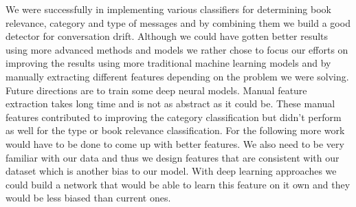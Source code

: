 \documentclass[11pt,a4paper]{article}
\begin{document}
We were successfully in implementing various classifiers for determining book relevance, category and type of messages and by combining them we build a good detector for conversation drift.
Although we could have gotten better results using more advanced methods and models we rather chose to focus our efforts on improving the results using more traditional machine learning models and by manually extracting different features depending on the problem we were solving.
Future directions are to train some deep neural models.
Manual feature extraction takes long time and is not as abstract as it could be.
These manual features contributed to improving the category classification but didn't perform as well for the type or book relevance classification.
For the following more work would have to be done to come up with better features.
We also need to be very familiar with our data and thus we design features that are consistent with our dataset which is another bias to our model.
With deep learning approaches we could build a network that would be able to learn this feature on it own and they would be less biased than current ones.



% 


\end{document}
